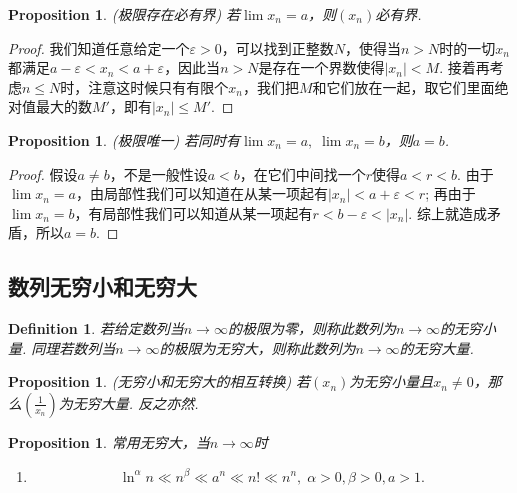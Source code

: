 \documentclass{article}
\newtheorem{proposition}[theorem]{Proposition}
\newtheorem{definition}[theorem]{Definition}
\begin{document}
\begin{proposition}
\rm {\color{red} (极限存在必有界)} 若$\lim x_n = a$，则$(x_n)$必有界.
\end{proposition}

\begin{proof}
我们知道任意给定一个$\varepsilon > 0$，可以找到正整数$N$，使得当$n > N$时的一切$x_n$都满足$ a-\varepsilon < x_n < a + \varepsilon$，因此当$n > N$是存在一个界数使得$|x_n| < M$. 接着再考虑$n \leq N$时，注意这时候只有有限个$x_n$，我们把$M$和它们放在一起，取它们里面绝对值最大的数$M'$，即有$|x_n| \leq M'$.
\end{proof} 

\begin{proposition}
\rm {\color{red} (极限唯一)} 若同时有$\lim x_n = a,\; \lim x_n = b$，则$a = b$.  
\end{proposition}

\begin{proof}
假设$a \neq b$，不是一般性设$a < b$，在它们中间找一个$r$使得$a < r < b$. 由于$\lim x_n = a$，由局部性我们可以知道在从某一项起有$|x_n| < a +\varepsilon < r$; 再由于$\lim x_n = b$，有局部性我们可以知道从某一项起有$r< b- \varepsilon <|x_n|$. 综上就造成矛盾，所以$a = b$.
\end{proof}

\subsection{数列无穷小和无穷大}

\begin{definition}
\rm 若给定数列当$n \rightarrow \infty$的极限为零，则称此数列为$n \rightarrow \infty$的{\color{red}无穷小量}. 同理若数列当$n \rightarrow \infty $的极限为无穷大，则称此数列为$n \rightarrow \infty$的{\color{red}无穷大量}.
\end{definition}

\begin{proposition}
\rm {\color{red} (无穷小和无穷大的相互转换)} 若$(x_n)$为无穷小量且$x_n \neq 0$，那么$(\frac{1}{x_n})$为无穷大量. 反之亦然.
\end{proposition}

\begin{proposition}
\rm {\color{red} 常用无穷大}，当$n \rightarrow \infty$时
\begin{enumerate}
	\item 
	$$
	\ln^\alpha n \ll n^\beta \ll a^n \ll n! \ll n^n,\; \alpha > 0,\beta > 0 ,a > 1.
	$$
\end{enumerate}
\end{proposition}
\end{document}
